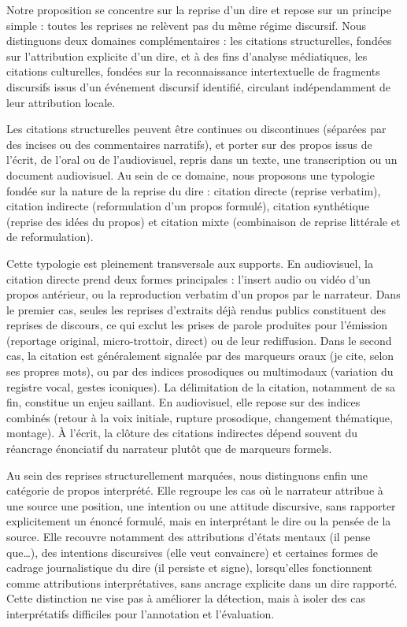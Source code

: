 \documentclass[final,fra]{anthology-ch}         %
\begin{document}
Notre proposition se concentre sur la reprise d'un dire et repose sur un
principe simple : toutes les reprises ne relèvent pas du même régime
discursif. Nous distinguons deux domaines complémentaires : les
citations structurelles, fondées sur l'attribution explicite d'un dire,
et à des fins d'analyse médiatiques, les citations culturelles, fondées
sur la reconnaissance intertextuelle de fragments discursifs issus d'un
événement discursif identifié, circulant indépendamment de leur
attribution locale.

Les citations structurelles peuvent être continues ou discontinues
(séparées par des incises ou des commentaires narratifs), et porter sur
des propos issus de l'écrit, de l'oral ou de l'audiovisuel, repris dans
un texte, une transcription ou un document audiovisuel. Au sein de ce
domaine, nous proposons une typologie fondée sur la nature de la reprise
du dire : citation directe (reprise verbatim), citation indirecte
(reformulation d'un propos formulé), citation synthétique (reprise des
idées du propos) et citation mixte (combinaison de reprise littérale et
de reformulation).

Cette typologie est pleinement transversale aux supports. En
audiovisuel, la citation directe prend deux formes principales :
l'insert audio ou vidéo d'un propos antérieur, ou la reproduction
verbatim d'un propos par le narrateur. Dans le premier cas, seules les
reprises d'extraits déjà rendus publics constituent des reprises de
discours, ce qui exclut les prises de parole produites pour l'émission
(reportage original, micro-trottoir, direct) ou de leur rediffusion.
Dans le second cas, la citation est généralement signalée par des
marqueurs oraux (\og je cite\fg{}, \og selon ses propres mots\fg{}), ou par des
indices prosodiques ou multimodaux (variation du registre vocal, gestes
iconiques). La délimitation de la citation, notamment de sa fin,
constitue un enjeu saillant. En audiovisuel, elle repose sur des indices
combinés (retour à la voix initiale, rupture prosodique, changement
thématique, montage). À l'écrit, la clôture des citations indirectes
dépend souvent du réancrage énonciatif du narrateur plutôt que de
marqueurs formels.

Au sein des reprises structurellement marquées, nous distinguons enfin
une catégorie de propos interprété. Elle regroupe les cas où le
narrateur attribue à une source une position, une intention ou une
attitude discursive, sans rapporter explicitement un énoncé formulé,
mais en interprétant le dire ou la pensée de la source. Elle recouvre
notamment des attributions d'états mentaux (\og il pense que\ldots{}\fg{}),
des intentions discursives (\og elle veut convaincre\fg{}) et certaines
formes de cadrage journalistique du dire (\og il persiste et signe\fg{}),
lorsqu'elles fonctionnent comme attributions interprétatives, sans
ancrage explicite dans un dire rapporté. Cette distinction ne vise pas à
améliorer la détection, mais à isoler des cas interprétatifs difficiles
pour l'annotation et l'évaluation.
\end{document}

